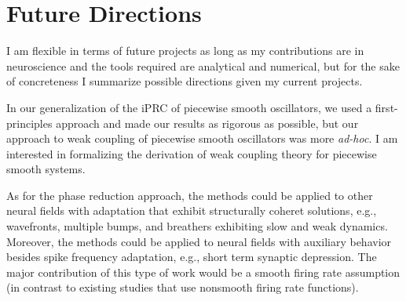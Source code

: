 \documentclass[a4paper,11pt]{article}
\begin{document}
\section{Future Directions}
I am flexible in terms of future projects as long as my contributions are in neuroscience and the tools required are analytical and numerical, but for the sake of concreteness I summarize possible directions given my current projects.

In our generalization of the iPRC of piecewise smooth oscillators, we used a first-principles approach and made our results as rigorous as possible, but our approach to weak coupling of piecewise smooth oscillators was more \textit{ad-hoc}. I am interested in formalizing the derivation of weak coupling theory for piecewise smooth systems. %

As for the phase reduction approach, the methods could be applied to other neural fields with adaptation that exhibit structurally coheret solutions, e.g., wavefronts, multiple bumps, and breathers exhibiting slow and weak dynamics. Moreover, the methods could be applied to neural fields with auxiliary behavior besides spike frequency adaptation, e.g., short term synaptic depression. The major contribution of this type of work would be a smooth firing rate assumption (in contrast to existing studies that use nonsmooth firing rate functions).



\end{document}
